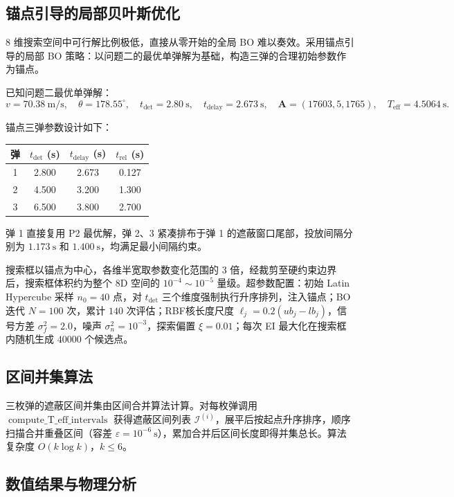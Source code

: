 \documentclass{ctexart}
\begin{document}
\subsection{锚点引导的局部贝叶斯优化}

8 维搜索空间中可行解比例极低，直接从零开始的全局 BO 难以奏效。采用锚点引导的局部 BO 策略：以问题二的最优单弹解为基础，构造三弹的合理初始参数作为锚点。

已知问题二最优单弹解：
\[
v = 70.38\ \mathrm{m/s},\quad \theta = 178.55^\circ,\quad t_{\text{det}} = 2.80\ \mathrm{s},\quad t_{\text{delay}} = 2.673\ \mathrm{s},\quad \mathbf{A} = (17603, 5, 1765),\quad T_{\text{eff}} = 4.5064\ \mathrm{s}.
\]

锚点三弹参数设计如下：
\begin{center}
\begin{tabular}{c|c|c|c}
\toprule
\textbf{弹} & $t_{\text{det}}$ (s) & $t_{\text{delay}}$ (s) & $t_{\text{rel}}$ (s) \\
\midrule
1 & 2.800 & 2.673 & 0.127 \\
2 & 4.500 & 3.200 & 1.300 \\
3 & 6.500 & 3.800 & 2.700 \\
\bottomrule
\end{tabular}
\end{center}
弹 1 直接复用 P2 最优解，弹 2、3 紧凑排布于弹 1 的遮蔽窗口尾部，投放间隔分别为 $1.173\ \mathrm{s}$ 和 $1.400\ \mathrm{s}$，均满足最小间隔约束。

搜索框以锚点为中心，各维半宽取参数变化范围的 3 倍，经裁剪至硬约束边界后，搜索框体积约为整个 8D 空间的 $10^{-4}\sim10^{-5}$ 量级。超参数配置：初始 Latin Hypercube 采样 $n_0=40$ 点，对 $t_{\text{det}}$ 三个维度强制执行升序排列，注入锚点；BO 迭代 $N=100$ 次，累计 $140$ 次评估；RBF核长度尺度 $\ell_j = 0.2(ub_j - lb_j)$，信号方差 $\sigma_f^2 = 2.0$，噪声 $\sigma_n^2 = 10^{-3}$，探索偏置 $\xi = 0.01$；每次 EI 最大化在搜索框内随机生成 $40000$ 个候选点。

\subsection{区间并集算法}

三枚弹的遮蔽区间并集由区间合并算法计算。对每枚弹调用 $\operatorname{compute\_T\_eff\_intervals}$ 获得遮蔽区间列表 $\mathcal{I}^{(i)}$，展平后按起点升序排序，顺序扫描合并重叠区间（容差 $\varepsilon = 10^{-6}\ \mathrm{s}$），累加合并后区间长度即得并集总长。算法复杂度 $O(k\log k)$，$k \leq 6$。

\subsection{数值结果与物理分析}
\end{document}
